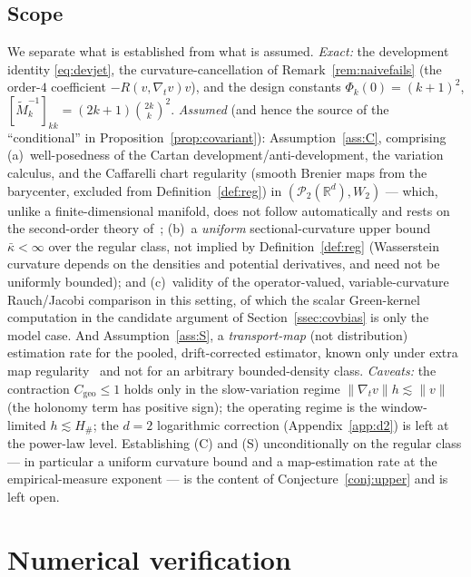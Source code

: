 \documentclass[11pt]{article}
\theoremstyle{definition}
\theoremstyle{remark}
\newcommand{\R}{\mathbb{R}}
\newcommand{\PP}{\mathcal{P}_2(\R^d)}
\begin{document}
\subsection{Scope}\label{ssec:covscope}
We separate what is established from what is assumed. \emph{Exact:} the development identity
\eqref{eq:devjet}, the curvature-cancellation of Remark~\ref{rem:naivefails} (the order-$4$
coefficient $-R(v,\nabla_t v)v$), and the design constants $\Phi_k(0)=(k+1)^2$,
$[\widetilde M_k^{-1}]_{kk}=(2k+1)\binom{2k}{k}^2$. \emph{Assumed} (and hence the source of the
``conditional'' in Proposition~\ref{prop:covariant}): Assumption~\ref{ass:C}, comprising
(a)~well-posedness of the Cartan development/anti-development, the variation calculus, and the
Caffarelli chart regularity (smooth Brenier maps from the barycenter, excluded from
Definition~\ref{def:reg}) in
$(\PP,W_2)$ --- which, unlike a finite-dimensional manifold, does not follow automatically and rests
on the second-order theory of~\cite{ags,gigli}; (b)~a \emph{uniform} sectional-curvature upper bound
$\bar\kappa<\infty$ over the regular class, not implied by Definition~\ref{def:reg} (Wasserstein
curvature depends on the densities and potential derivatives, and need not be uniformly bounded); and
(c)~validity of the operator-valued, variable-curvature Rauch/Jacobi comparison in this setting, of
which the scalar Green-kernel computation in the candidate argument of Section~\ref{ssec:covbias} is
only the model case. And
Assumption~\ref{ass:S}, a \emph{transport-map} (not distribution) estimation rate for the pooled,
drift-corrected estimator, known only under extra map regularity~\cite{hutter,manole} and not for an
arbitrary bounded-density class. \emph{Caveats:} the contraction $C_{\mathrm{geo}}\le1$ holds only in
the slow-variation regime $\|\nabla_t v\|h\lesssim\|v\|$ (the holonomy term has positive sign); the
operating regime is the window-limited $h\lesssim H_\#$; the $d=2$ logarithmic correction
(Appendix~\ref{app:d2}) is left at the power-law level. Establishing (C) and (S) unconditionally on
the regular class --- in particular a uniform curvature bound and a map-estimation rate at the
empirical-measure exponent --- is the content of Conjecture~\ref{conj:upper} and is left open.


\section{Numerical verification}\label{app:numerics}
\end{document}
